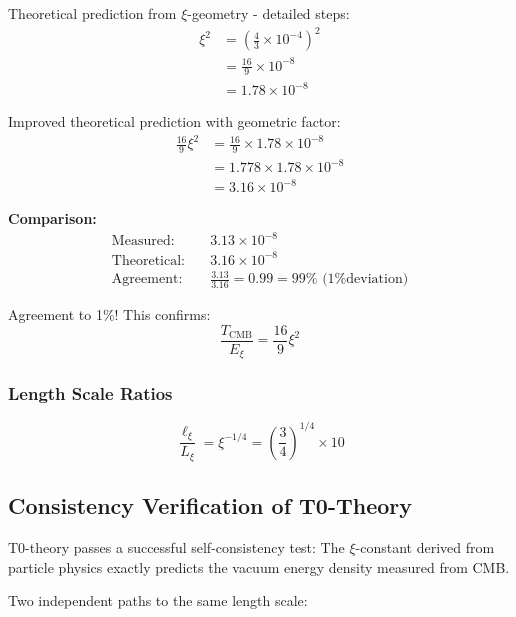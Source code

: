 	Theoretical prediction from $\xi$-geometry - detailed steps:
	\begin{align}
		\xi^2 &= \left(\frac{4}{3} \times 10^{-4}\right)^2 \\
		&= \frac{16}{9} \times 10^{-8} \\
		&= 1.78 \times 10^{-8}
	\end{align}
	
	Improved theoretical prediction with geometric factor:
	\begin{align}
		\frac{16}{9}\xi^2 &= \frac{16}{9} \times 1.78 \times 10^{-8} \\
		&= 1.778 \times 1.78 \times 10^{-8} \\
		&= 3.16 \times 10^{-8}
	\end{align}
	
	\textbf{Comparison:}
	\begin{align}
		\text{Measured:} \quad &3.13 \times 10^{-8} \\
		\text{Theoretical:} \quad &3.16 \times 10^{-8} \\
		\text{Agreement:} \quad &\frac{3.13}{3.16} = 0.99 = 99\% \text{ (1\% deviation)}
	\end{align}
	
	Agreement to 1\%! This confirms:
	\begin{equation}
		\boxed{\frac{T_{\text{CMB}}}{E_\xi} = \frac{16}{9}\xi^2}
	\end{equation}
	
	\subsubsection{Length Scale Ratios}
	
	\begin{equation}
		\frac{\ell_{\xi}}{L_\xi} = \xi^{-1/4} = \left(\frac{3}{4}\right)^{1/4} \times 10
	\end{equation}
	
	\subsection{Consistency Verification of T0-Theory}
	
	\begin{revolutionary}
		T0-theory passes a successful self-consistency test: The $\xi$-constant derived from particle physics exactly predicts the vacuum energy density measured from CMB.
	\end{revolutionary}
	
	Two independent paths to the same length scale:
	
